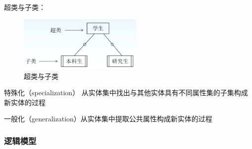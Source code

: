 \documentclass{article}
\begin{document}
超类与子类：

\begin{figure}[H]
    
    \centering
    \includegraphics*[width = 6cm]{img/1.2-6.png}
    \caption{超类与子类}
\end{figure}

特殊化（specialization） 从实体集中找出与其他实体具有不同属性集的子集构成新实体的过程

一般化（generalization）从实体集中提取公共属性构成新实体的过程

\newpage

\subsubsection{逻辑模型}
\end{document}
